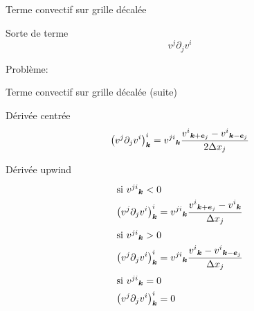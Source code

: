 \begin{frame}{Terme convectif sur grille décalée}
\begin{block}{Sorte de terme}
 \begin{equation*}
v^{j}\partial_{j}v^{i}
\end{equation*}
\end{block}
\begin{alertblock}{Problème:}
\end{alertblock}

\end{frame}

\begin{frame}{Terme convectif sur grille décalée (suite)}
\begin{block}{Dérivée centrée}
 \begin{equation*}
\left(v^{j}\partial_{j}v^{i}\right)^{i}_{{\boldsymbol {k}}}={v^{ji}}_{{\boldsymbol {k}}}\frac{{v^{i}}_{{\boldsymbol {k}}+{\boldsymbol {e}}_j}-{v^{i}}_{{\boldsymbol {k}}-{\boldsymbol {e}}_j}}{2\Delta x_{j}}
\end{equation*}
\end{block}

\begin{block}{Dérivée upwind}
 \setlength{\abovedisplayskip}{-1pt}
 \setlength{\abovedisplayshortskip}{-1pt}
  \setlength{\belowdisplayskip}{-1pt}
 \setlength{\belowdisplayshortskip}{-1pt}
 \begin{align*}
\shortintertext{si ${v^{ji}}_{{\boldsymbol {k}}}<0$}
\left(v^{j}\partial_{j}v^{i}\right)^{i}_{{\boldsymbol {k}}}&={v^{ji}}_{{\boldsymbol {k}}}\frac{{v^{i}}_{{\boldsymbol {k}}+{\boldsymbol {e}}_j}-{v^{i}}_{{\boldsymbol {k}}}}{\Delta x_{j}}\\
\shortintertext{si ${v^{ji}}_{{\boldsymbol {k}}}>0$}
\left(v^{j}\partial_{j}v^{i}\right)^{i}_{{\boldsymbol {k}}}&={v^{ji}}_{{\boldsymbol {k}}}\frac{{v^{i}}_{{\boldsymbol {k}}}-{v^{i}}_{{\boldsymbol {k}}-{\boldsymbol {e}}_j}}{\Delta x_{j}}\\
\shortintertext{si ${v^{ji}}_{{\boldsymbol {k}}}=0$}
\left(v^{j}\partial_{j}v^{i}\right)^{i}_{{\boldsymbol {k}}}&=0
\end{align*}
\end{block}

\end{frame}

